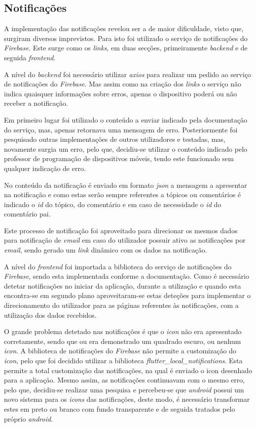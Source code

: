 \subsection{Notificações}

A implementação das notificações revelou ser a de maior dificuldade, visto que, surgiram diversos imprevistos. Para isto foi utilizado o serviço de notificações do \textit{Firebase}. Este surge como os \textit{links}, em duas secções, primeiramente \textit{backend} e de seguida \textit{frontend}.

A nível do \textit{backend} foi necessário utilizar \textit{axios} para realizar um pedido ao serviço de notificações do \textit{Firebase}. Mas assim como na criação dos \textit{links} o serviço não indica quaisquer informações sobre erros, apenas o dispositivo poderá ou não receber a notificação. 

Em primeiro lugar foi utilizado o conteúdo a enviar indicado pela documentação do serviço, mas, apenas retornava uma mensagem de erro. Posteriormente foi pesquisado outras implementações de outros utilizadores e testadas, mas, novamente surgia um erro, pelo que, decidiu-se utilizar o conteúdo indicado pelo professor de programação de dispositivos móveis, tendo este funcionado sem qualquer indicação de erro. 

No conteúdo da notificação é enviado em formato \textit{json} a mensagem a apresentar na notificação e como estas serão sempre referentes a tópicos ou comentários é indicado o \textit{id} do tópico, do comentário e em caso de necessidade o \textit{id} do comentário pai.

Este processo de notificação foi aproveitado para direcionar os mesmos dados para notificação de \textit{email} em caso do utilizador possuir ativo as notificações por \textit{email}, sendo gerado um \textit{link} dinâmico com os dados na notificação.

A nível do \textit{frontend} foi importada a biblioteca do serviço de notificações do \textit{Firebase}, sendo esta implementada conforme a documentação. Como é necessário detetar notificações no iniciar da aplicação, durante a utilização e quando esta encontra-se em segundo plano aproveitaram-se estas deteções para implementar o direcionamento do utilizador para as páginas referentes às notificações, com a utilização dos dados recebidos.

O grande problema detetado nas notificações é que o \textit{icon} não era apresentado corretamente, sendo que ou era demonstrado um quadrado escuro, ou nenhum \textit{icon}. A biblioteca de notificações do \textit{Firebase} não permite a customização do \textit{icon}, pelo que foi decidido utilizar a biblioteca \textit{flutter\_local\_notifications}. Esta permite a total customização das notificações, na qual é enviado o icon desenhado para a aplicação. Mesmo assim, as notificações continuavam com o mesmo erro, pelo que, decidiu-se realizar uma pesquisa e percebeu-se que \textit{android} possui um novo sistema para os \textit{icons} das notificações, deste modo, é necessário transformar estes em preto ou branco com fundo transparente e de seguida tratados pelo próprio \textit{android}.

